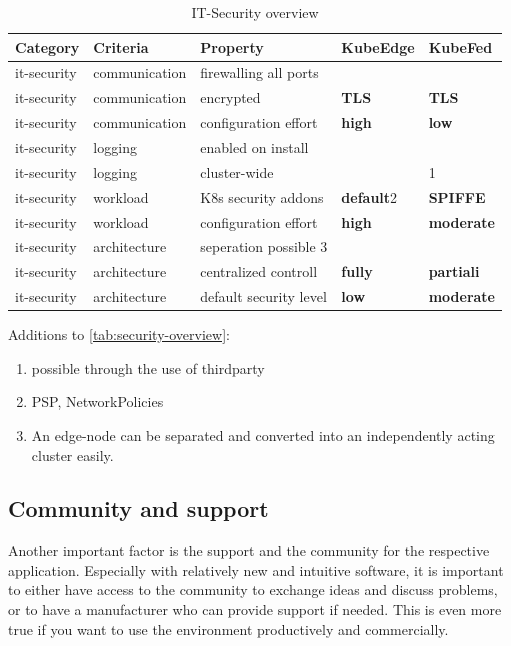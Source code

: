 \documentclass[MSC,Master,english]{twbook}%
\newcommand{\cmark}{\ding{51}}%
\newcommand{\xmark}{\ding{55}}%
\begin{document}
\begin{table}[ht]
    \begin{center}
        \begin{tabular}{|l|l|l|l|l|}
            \hline
            Category & Criteria & Property & \textbf{KubeEdge} & \textbf{KubeFed} \\
            \hline
            it-security & communication & firewalling all ports & \cmark & \xmark \\
            it-security & communication & encrypted & \textbf{TLS} & \textbf{TLS} \\
            it-security & communication & configuration effort & \textbf{high} & \textbf{low} \\
            it-security & logging & enabled on install & \xmark & \cmark \\
            it-security & logging & cluster-wide & \cmark & \xmark \tiny{1} \\
            it-security & workload & K8s security addons & \textbf{default}\tiny{2} & \textbf{SPIFFE} \cite{ke-secure-fw} \\
            it-security & workload & configuration effort & \textbf{high} & \textbf{moderate} \\
            it-security & architecture & seperation possible \tiny{3} & \xmark & \cmark \\
            it-security & architecture & centralized controll & \textbf{fully} & \textbf{partiali} \\
            it-security & architecture & default security level & \textbf{low} & \textbf{moderate} \\           
            \hline
        \end{tabular}
        \caption{IT-Security overview}
        \label{tab:security-overview}
    \end{center}
\end{table}

Additions to \autoref{tab:security-overview}:
\begin{enumerate}
    \itemsep0em
    \item possible through the use of thirdparty
    \item \ac{PSP}, NetworkPolicies
    \item An edge-node can be separated and converted into an independently acting cluster easily.
\end{enumerate}

\subsection{Community and support}
Another important factor is the support and the community for the respective application. Especially with relatively new and intuitive software, it is important to either have access to the community to exchange ideas and discuss problems, or to have a manufacturer who can provide support if needed. This is even more true if you want to use the environment productively and commercially.
\end{document}
